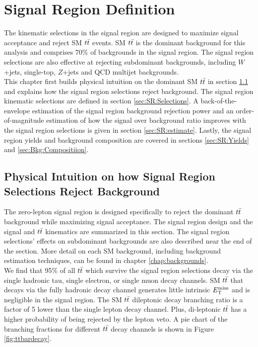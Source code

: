 
\chapter{Signal Region Definition}
\label{chap:SignalRegion}

\indent The kinematic selections in the signal region are designed to maximize signal acceptance and reject SM $t\bar{t}$ events.  SM $t\bar{t}$ is the dominant background for this analysis and comprises $70$\% of backgrounds in the signal region.  The signal region selections are also effective at rejecting subdominant backgrounds, including $W$+jets, single-top, $Z$+jets and QCD multijet backgrounds.  \\

\indent This chapter first builds physical intuition on the dominant SM $t\bar{t}$ in section \ref{sec:SR:physical} and explains how the signal region selections reject background.  The signal region kinematic selections are defined in section \ref{sec:SR:Selections}.  A back-of-the-envelope estimation of the signal region background rejection power and an order-of-magnitude estimation of how the signal over background ratio improves with the signal region selections is given in section \ref{sec:SR:estimate}. Lastly, the signal region yields and background composition are covered in sections \ref{sec:SR:Yields} and \ref{sec:Bkg:Compositiion}.  \\

\section{Physical Intuition on how Signal Region Selections Reject Background}
\label{sec:SR:physical}

\indent The zero-lepton signal region is designed specifically to reject the dominant $t\bar{t}$ background while maximizing signal acceptance.  The signal region design and the signal and $t\bar{t}$ kinematics are summarized in this section.  The signal region selections' effects on subdominant backgrounds are also described near the end of the section. More detail on each SM background, including background estimation techniques, can be found in chapter \ref{chap:backgrounds}. \\

\indent  We find that 95\% of all $t\bar{t}$ which survive the signal region selections decay via the single hadronic tau, single electron, or single muon decay channels.  SM $t\bar{t}$ that decays via the fully hadronic decay channel generates little intrinsic $E_{\mathrm{T}}^{\mathrm{miss}}$ and is negligible in the signal region.  The SM $t\bar{t}$ dileptonic decay branching ratio is a factor of 5 lower than the single lepton decay channel. Plus, di-leptonic $t\bar{t}$ has a higher probability of being rejected by the lepton veto.  A pie chart of the branching fractions for different $t\bar{t}$ decay channels is shown in Figure \ref{fig:ttbardecay}. \\


